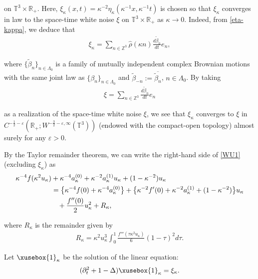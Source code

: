 \documentclass[%
11pt,  reqno]{amsart}
\def\<#1>{\xusebox{#1}}
\newcommand{\1}{\hspace{0.2mm}\text{I}\hspace{0.2mm}}
\newcommand{\noi}{\noindent}
\newcommand{\Z}{\mathbb{Z}}
\newcommand{\R}{\mathbb{R}}
\newcommand{\T}{\mathbb{T}}
\newcommand{\be}{\beta}
\newcommand{\eps}{\varepsilon}
\newcommand{\kk}{\kappa}
\newcommand{\Ld}{\Lambda}
\newcommand{\ft}{\widehat}
\newcommand{\wt}{\widetilde}
\newcommand{\cj}{\overline}
\numberwithin{equation}{section}
\numberwithin{theorem}{section}
\begin{document}
\noi
on $\T^3\times \R_+$.
Here, 
 $\xi_{\kk} (x, t) = \kk^{-2} \eta_{\kk} (\kk^{-1} x, \kk^{-1} t)$ is chosen so that 
$\xi_\kk$ converges in law to 
the space-time white noise $\xi$ on $\T^3\times \R_+$ as $\kk \to 0$.
Indeed, from \eqref{eta-kappa}, 
 we deduce that
\begin{align}
\label{xi-kappa}
\xi_\kk =  \sum_{n\in \Z^3}  \ft {\rho}(\kk n)  \frac{d\wt \be _n}{dt} e_{n}, 
\end{align}

\noi
where $\{\wt \be_n\}_{n \in \Ld_0}$ is a family of 
mutually independent complex Brownian motions 
with the same joint law as $\{\beta_n\}_{n\in \Ld_0}$
and $\wt \beta_{-n} := \cj{\wt \be_n}$, $n \in \Ld_0$. 
By taking 
\begin{align*}
\xi =  \sum_{n\in \Z^3}    \frac{d\wt \be _n}{dt} e_{n}
\end{align*}

\noi
as a realization of the space-time white noise $\xi$, 
we see that $\xi_\kk$ converges to $\xi$
in $C^{-\frac 12-\eps}(\R_+; W^{-\frac 32- \eps, \infty}(\T^3))$
(endowed with the compact-open topology)
almost surely for any $\eps > 0$.


By the Taylor remainder theorem, 
we can write the right-hand side of \eqref{WU1} (excluding $\xi_\kk$)
as 
\begin{align*}
\begin{split}
 \kk^{- 4} f (\kk^{2} u_{\kk}) & + \kk^{- 4} a_{\kk}^{(0)} + \kk^{- 2} a_{\kk}^{(1)} u_{\kk} 
 +  (1-\kk^{-2})u_\kk\\
 & = \big\{\kk^{
    - 4} f (0) + \kk^{ - 4} a_{\kk}^{(0)}\big\} 
 + \big\{\kk^{- 2} f' (0) + \kk^{- 2} a_{\kk}^{(1)}+  (1-\kk^{-2}) \big\} u_{\kk}\\
 & \hphantom{X}  +
   \frac{f'' (0)}{2}   u_{\kk}^2 + R_{\kk},   
\end{split}
\end{align*}

\noi
where $R_{\kk}$ is the remainder given by 
\begin{align}
 R_{\kk} = \kk^2 u_{\kk}^3 \int_0^1 \frac{ f'''
   (\tau \kk^2 u_{\kk})}{6}  (1 - \tau)^2  d\tau . 
\label{WU3}
\end{align}

Let  $\<1>_{\kk}$ be the solution of the linear equation:
\begin{align}
 (\partial_t^2  + 1 - \Delta) \<1>_\kk = \xi_{\kk}. 
\label{WU3a}
 \end{align}
\end{document}
